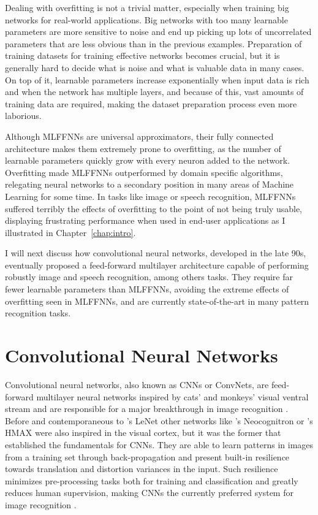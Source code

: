 Dealing with overfitting is not a trivial matter, especially when training big networks for real-world applications.
Big networks with too many learnable parameters are more sensitive to noise and end up picking up lots of uncorrelated parameters that are less obvious than in the previous examples.
Preparation of training datasets for training effective networks becomes crucial, but it is generally hard to decide what is noise and what is valuable data in many cases.
On top of it, learnable parameters increase exponentially when input data is rich and when the network has multiple layers, and because of this, vast amounts of training data are required, making the dataset preparation process even more laborious.

Although MLFFNNs are universal approximators, their fully connected architecture makes them extremely prone to overfitting, as the number of learnable parameters quickly grow with every neuron added to the network.
Overfitting made MLFFNNs outperformed by domain specific algorithms, relegating neural networks to a secondary position in many areas of Machine Learning for some time.
In tasks like image or speech recognition, MLFFNNs suffered terribly the effects of overfitting to the point of not being truly usable, displaying frustrating performance when used in end-user applications as I illustrated in Chapter~\ref{chap:intro}.

I will next discuss how convolutional neural networks, developed in the late 90s, eventually proposed a feed-forward multilayer architecture capable of performing robustly image and speech recognition, among others tasks.
They require far fewer learnable parameters than MLFFNNs, avoiding the extreme effects of overfitting seen in MLFFNNs, and are currently state-of-the-art in many pattern recognition tasks.



\section{Convolutional Neural Networks}
\label{sec:theory:convnets}
Convolutional neural networks, also known as CNNs or ConvNets, are feed-forward multilayer neural networks inspired by cats' and monkeys' visual ventral stream \cite{Hubel1968,Lawrence1997} and are responsible for a major breakthrough in image recognition \cite{LeCun1995}.
Before and contemporaneous to \citeauthor{LeCun1998}'s LeNet \cite{LeCun1998} other networks like \citeauthor{Fukushima1980}'s Neocognitron \cite{Fukushima1980} or \citeauthor{Riesenhuber1999}'s HMAX \cite{Riesenhuber1999} were also inspired in the visual cortex, but it was the former that established the fundamentals for CNNs.
They are able to learn patterns in images from a training set through back-propagation and present built-in resilience towards translation and distortion variances in the input.
Such resilience minimizes pre-processing tasks both for training and classification and greatly reduces human supervision, making CNNs the currently preferred system for image recognition \cite{Visin2015}.

